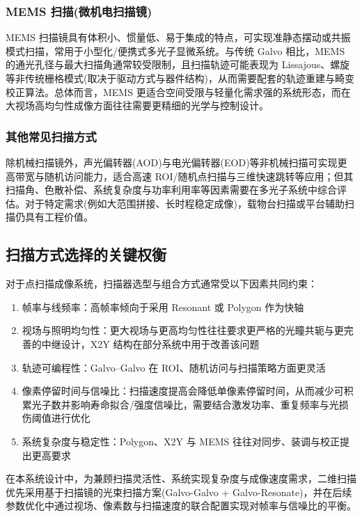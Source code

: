\subsubsection{MEMS 扫描(微机电扫描镜)}
MEMS 扫描镜具有体积小、惯量低、易于集成的特点，可实现准静态摆动或共振模式扫描，常用于小型化/便携式多光子显微系统。与传统 Galvo 相比，MEMS 的通光孔径与最大扫描角通常较受限制，且扫描轨迹可能表现为 Lissajous、螺旋等非传统栅格模式(取决于驱动方式与器件结构)，从而需要配套的轨迹重建与畸变校正算法。总体而言，MEMS 更适合空间受限与轻量化需求强的系统形态，而在大视场高均匀性成像方面往往需要更精细的光学与控制设计。

\subsubsection{其他常见扫描方式}
除机械扫描镜外，声光偏转器(AOD)与电光偏转器(EOD)等非机械扫描可实现更高带宽与随机访问能力，适合高速 ROI/随机点扫描与三维快速跳转等应用；但其扫描角、色散补偿、系统复杂度与功率利用率等因素需要在多光子系统中综合评估。对于特定需求(例如大范围拼接、长时程稳定成像)，载物台扫描或平台辅助扫描仍具有工程价值。



\subsection{扫描方式选择的关键权衡}\label{2.3.3}
对于点扫描成像系统，扫描器选型与组合方式通常受以下因素共同约束：

\begin{enumerate}
    \item 帧率与线频率：高帧率倾向于采用 Resonant 或 Polygon 作为快轴
    \item 视场与照明均匀性：更大视场与更高均匀性往往要求更严格的光瞳共轭与更完善的中继设计，X2Y 结构在部分系统中用于改善该问题
    \item 轨迹可编程性：Galvo–Galvo 在 ROI、随机访问与扫描策略方面更灵活
    \item 像素停留时间与信噪比：扫描速度提高会降低单像素停留时间，从而减少可积累光子数并影响寿命拟合/强度信噪比，需要结合激发功率、重复频率与光损伤阈值进行优化
    \item 系统复杂度与稳定性：Polygon、X2Y 与 MEMS 往往对同步、装调与校正提出更高要求
\end{enumerate}

在本系统设计中，为兼顾扫描灵活性、系统实现复杂度与成像速度需求，二维扫描优先采用基于扫描镜的光束扫描方案(Galvo-Galvo + Galvo-Resonate)，并在后续参数优化中通过视场、像素数与扫描速度的联合配置实现对帧率与信噪比的平衡。



